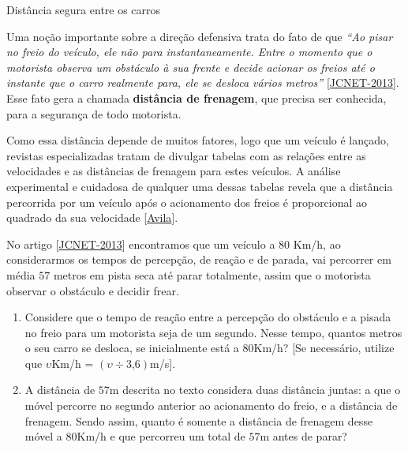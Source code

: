 \label{\detokenize{AF209-0:ativ-funcao-quadratica-distancia-frenagem}}
\clearpage
\begin{task}{Distância segura entre os carros}

Uma noção importante sobre a direção defensiva trata do fato de que \textit{“Ao pisar no freio do veículo, ele não para instantaneamente. Entre o momento que o motorista observa um obstáculo à sua frente e decide acionar os freios até o instante que o carro realmente para, ele se desloca vários metros”} [\href{https://www.jcnet.com.br/noticias/geral/2013/02/367699-direcao-defensiva--saiba-como-a-velocidade-influi-na-frenagem-do-veiculo.html}{JCNET-2013}]. Esse fato gera a chamada \textbf{distância de frenagem}, que precisa ser conhecida, para a segurança de todo motorista.

Como essa distância depende de muitos fatores, logo que um veículo é lançado, revistas especializadas tratam de divulgar tabelas com as relações entre as velocidades e as distâncias de frenagem para estes veículos. A análise experimental e cuidadosa de qualquer uma dessas tabelas revela que a distância percorrida por um veículo após o acionamento dos freios é proporcional ao quadrado da sua velocidade [\href{http://rpm.org.br/cdrpm/12/5.htm}{Avila}].

No artigo [\href{https://www.jcnet.com.br/noticias/geral/2013/02/367699-direcao-defensiva--saiba-como-a-velocidade-influi-na-frenagem-do-veiculo.html}{JCNET-2013}] encontramos que um veículo a \(80\) Km/h, ao considerarmos os tempos de percepção, de reação e de parada, vai percorrer em média \(57\) metros em pista seca até parar totalmente, assim que o motorista observar o obstáculo e decidir frear.

\begin{enumerate}
\item {} 
Considere que o tempo de reação entre a percepção do obstáculo e a pisada no freio para um motorista seja de um segundo. Nesse tempo, quantos metros o seu carro se desloca, se inicialmente está a 80Km/h? {[}Se necessário, utilize que \(\upsilon\)Km/h = \(( \upsilon \div 3\text{,}6 )\)m/s{]}.

\item {} 
A distância de \(57\)m descrita no texto considera duas distância juntas: a que o móvel percorre no segundo anterior ao acionamento do freio, e a distância de frenagem. Sendo assim, quanto é somente a distância de frenagem desse móvel a \(80\)Km/h e que percorreu um total de \(57\)m antes de parar?


\end{enumerate}
\end{task}
